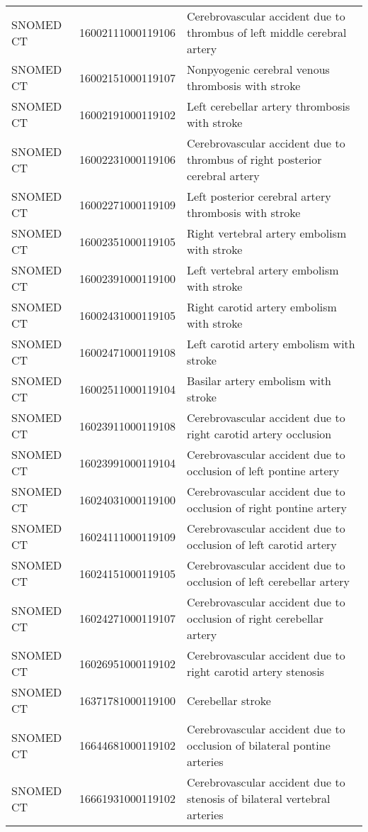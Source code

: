 \begin{longtable}{p{}p{}p{}}
  SNOMED CT & 16002111000119106 & Cerebrovascular accident due to thrombus of left middle cerebral artery \\ 
  SNOMED CT & 16002151000119107 & Nonpyogenic cerebral venous thrombosis with stroke \\ 
  SNOMED CT & 16002191000119102 & Left cerebellar artery thrombosis with stroke \\ 
  SNOMED CT & 16002231000119106 & Cerebrovascular accident due to thrombus of right posterior cerebral artery \\ 
  SNOMED CT & 16002271000119109 & Left posterior cerebral artery thrombosis with stroke \\ 
  SNOMED CT & 16002351000119105 & Right vertebral artery embolism with stroke \\ 
  SNOMED CT & 16002391000119100 & Left vertebral artery embolism with stroke \\ 
  SNOMED CT & 16002431000119105 & Right carotid artery embolism with stroke \\ 
  SNOMED CT & 16002471000119108 & Left carotid artery embolism with stroke \\ 
  SNOMED CT & 16002511000119104 & Basilar artery embolism with stroke \\ 
  SNOMED CT & 16023911000119108 & Cerebrovascular accident due to right carotid artery occlusion \\ 
  SNOMED CT & 16023991000119104 & Cerebrovascular accident due to occlusion of left pontine artery \\ 
  SNOMED CT & 16024031000119100 & Cerebrovascular accident due to occlusion of right pontine artery \\ 
  SNOMED CT & 16024111000119109 & Cerebrovascular accident due to occlusion of left carotid artery \\ 
  SNOMED CT & 16024151000119105 & Cerebrovascular accident due to occlusion of left cerebellar artery \\ 
  SNOMED CT & 16024271000119107 & Cerebrovascular accident due to occlusion of right cerebellar artery \\ 
  SNOMED CT & 16026951000119102 & Cerebrovascular accident due to right carotid artery stenosis \\ 
  SNOMED CT & 16371781000119100 & Cerebellar stroke \\ 
  SNOMED CT & 16644681000119102 & Cerebrovascular accident due to occlusion of bilateral pontine arteries \\ 
  SNOMED CT & 16661931000119102 & Cerebrovascular accident due to stenosis of bilateral vertebral arteries \\ 

\end{longtable}
